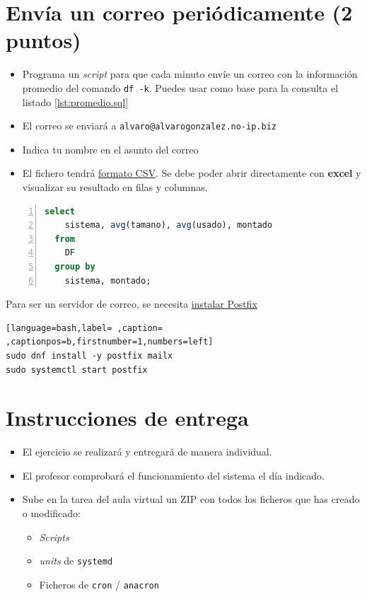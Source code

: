 \documentclass[a4paper]{article}
\begin{document}
\section{Envía un correo periódicamente (2 puntos)}
\label{sec:org000000c}


\begin{itemize}
\item Programa un \emph{script} para que cada minuto envíe un correo con la información promedio del comando  \texttt{df -k}. Puedes usar como base para la consulta el listado \ref{lst:promedio.sql}
\item El correo se enviará a \texttt{alvaro@alvarogonzalez.no-ip.biz}
\item Indica tu nombre en el asunto del correo
\item El fichero tendrá \href{https://stackoverflow.com/questions/643137/how-do-i-spool-to-a-csv-formatted-file-using-sqlplus\#654723}{formato CSV}. Se debe poder abrir directamente con \textbf{excel} y visualizar su resultado en filas y columnas.
\end{itemize}



\begin{minipage}{\textwidth}
\begin{lstlisting}[language=SQL,label=lst:promedio.sql,caption={Consulta tipo para extraer información promedio},captionpos=b,firstnumber=1,numbers=left]
  select 
    sistema, avg(tamano), avg(usado), montado
  from 
    DF
  group by
    sistema, montado;
\end{lstlisting}
\end{minipage}

Para ser un servidor de correo, se necesita \href{https://docs.oracle.com/en/learn/oracle-linux-postfix/\#configure-postfix}{instalar Postfix}
\begin{lstlisting}[language=bash,label= ,caption= ,captionpos=b,firstnumber=1,numbers=left]
sudo dnf install -y postfix mailx
sudo systemctl start postfix
\end{lstlisting}


\section{Instrucciones de entrega}
\label{sec:org000000f}

\begin{itemize}
\item El ejercicio se realizará y entregará de manera individual.
\item El profesor comprobará el funcionamiento del sistema el día indicado.
\item Sube en la tarea del aula virtual un ZIP con todos los ficheros que has creado o modificado:
\begin{itemize}
\item \emph{Scripts}
\item \emph{units} de \texttt{systemd}
\item Ficheros de \texttt{cron} / \texttt{anacron}
\end{itemize}
\end{itemize}
\end{document}
